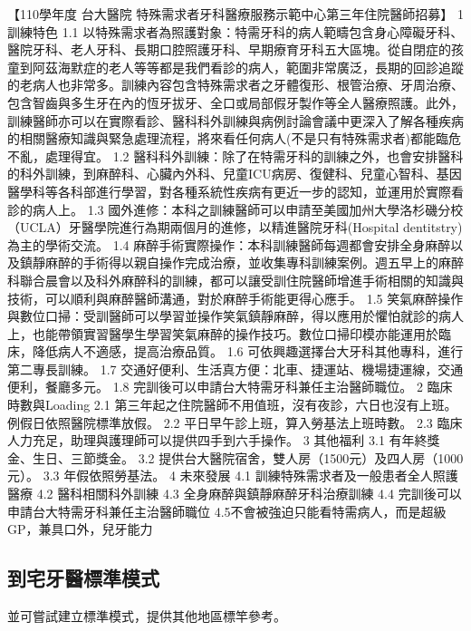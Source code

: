 【110學年度 台大醫院 特殊需求者牙科醫療服務示範中心第三年住院醫師招募】
1 訓練特色
1.1 以特殊需求者為照護對象：特需牙科的病人範疇包含身心障礙牙科、醫院牙科、老人牙科、長期口腔照護牙科、早期療育牙科五大區塊。從自閉症的孩童到阿茲海默症的老人等等都是我們看診的病人，範圍非常廣泛，長期的回診追蹤的老病人也非常多。訓練內容包含特殊需求者之牙體復形、根管治療、牙周治療、包含智齒與多生牙在內的恆牙拔牙、全口或局部假牙製作等全人醫療照護。此外，訓練醫師亦可以在實際看診、醫科科外訓練與病例討論會議中更深入了解各種疾病的相關醫療知識與緊急處理流程，將來看任何病人(不是只有特殊需求者)都能臨危不亂，處理得宜。
1.2 醫科科外訓練：除了在特需牙科的訓練之外，也會安排醫科的科外訓練，到麻醉科、心臟內外科、兒童ICU病房、復健科、兒童心智科、基因醫學科等各科部進行學習，對各種系統性疾病有更近一步的認知，並運用於實際看診的病人上。
1.3 國外進修：本科之訓練醫師可以申請至美國加州大學洛杉磯分校（UCLA）牙醫學院進行為期兩個月的進修，以精進醫院牙科(Hospital dentitstry)為主的學術交流。
1.4 麻醉手術實際操作：本科訓練醫師每週都會安排全身麻醉以及鎮靜麻醉的手術得以親自操作完成治療，並收集專科訓練案例。週五早上的麻醉科聯合晨會以及科外麻醉科的訓練，都可以讓受訓住院醫師增進手術相關的知識與技術，可以順利與麻醉醫師溝通，對於麻醉手術能更得心應手。
1.5 笑氣麻醉操作與數位口掃：受訓醫師可以學習並操作笑氣鎮靜麻醉，得以應用於懼怕就診的病人上，也能帶領實習醫學生學習笑氣麻醉的操作技巧。數位口掃印模亦能運用於臨床，降低病人不適感，提高治療品質。
1.6 可依興趣選擇台大牙科其他專科，進行第二專長訓練。
1.7 交通好便利、生活真方便：北車、捷運站、機場捷運線，交通便利，餐廳多元。
1.8 完訓後可以申請台大特需牙科兼任主治醫師職位。
2 臨床時數與Loading
2.1 第三年起之住院醫師不用值班，沒有夜診，六日也沒有上班。例假日依照醫院標準放假。
2.2 平日早午診上班，算入勞基法上班時數。
2.3 臨床人力充足，助理與護理師可以提供四手到六手操作。
3 其他福利
3.1 有年終獎金、生日、三節獎金。
3.2 提供台大醫院宿舍，雙人房（1500元）及四人房（1000元）。
3.3 年假依照勞基法。
4 未來發展
4.1 訓練特殊需求者及一般患者全人照護醫療
4.2 醫科相關科外訓練
4.3 全身麻醉與鎮靜麻醉牙科治療訓練
4.4 完訓後可以申請台大特需牙科兼任主治醫師職位
4.5不會被強迫只能看特需病人，而是超級GP，兼具口外，兒牙能力


\subsection{到宅牙醫標準模式}
並可嘗試建立標準模式，提供其他地區標竿參考。


